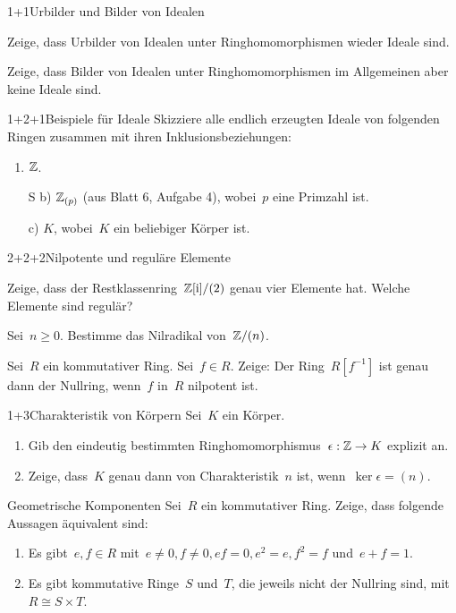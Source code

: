 \documentclass{algblatt}
\begin{document}

\begin{aufgabeE}{1+1}{Urbilder und Bilder von Idealen}
\item Zeige, dass Urbilder von Idealen unter Ringhomomorphismen wieder Ideale
sind.
\item Zeige, dass Bilder von Idealen unter Ringhomomorphismen im Allgemeinen
aber keine Ideale sind.
\end{aufgabeE}

\begin{aufgabe}{1+2+1}{Beispiele für Ideale}
Skizziere alle endlich erzeugten Ideale von folgenden Ringen zusammen mit ihren
Inklusionsbeziehungen:
\begin{enumerate}
\item $\mathbb{Z}$.
\item[S b)] $\mathbb{Z}_{(p)}$ (aus Blatt 6, Aufgabe 4), wobei~$p$ eine Primzahl ist.
\item[c)] $K$, wobei~$K$ ein beliebiger Körper ist.
\end{enumerate}
\end{aufgabe}

\begin{aufgabeE}{2+2+2}{Nilpotente und reguläre Elemente}
\item Zeige, dass der Restklassenring~$\mathbb{Z}[\mathrm{i}]/(2)$ genau vier Elemente hat.
Welche Elemente sind regulär?
\item Sei~$n \geq 0$. Bestimme das Nilradikal von~$\mathbb{Z}/(n)$.
\item Sei~$R$ ein kommutativer Ring. Sei~$f \in R$. Zeige: Der Ring~$R[f^{-1}]$ ist
genau dann der Nullring, wenn~$f$ in~$R$ nilpotent ist.
\end{aufgabeE}

\begin{aufgabe}{1+3}{Charakteristik von Körpern}
Sei~$K$ ein Körper.
\begin{enumerate}
\item Gib den eindeutig bestimmten Ringhomomorphismus~$\epsilon : \mathbb{Z} \to K$
explizit an.
\item Zeige, dass~$K$ genau dann von Charakteristik~$n$ ist, wenn~$\ker
\epsilon = (n)$.
\end{enumerate}
\end{aufgabe}

\begin{aufgabe}{4}{Geometrische Komponenten}
Sei~$R$ ein kommutativer Ring. Zeige, dass folgende Aussagen äquivalent sind:
\begin{enumerate}
\item Es gibt~$e, f \in R$ mit~$e \neq 0, f \neq 0, ef = 0, e^2 = e, f^2 = f$
und~$e + f = 1$.
\item Es gibt kommutative Ringe~$S$ und~$T$, die jeweils nicht der Nullring
sind, mit~$R \cong S \times T$.
\end{enumerate}
\end{aufgabe}
\end{document}
